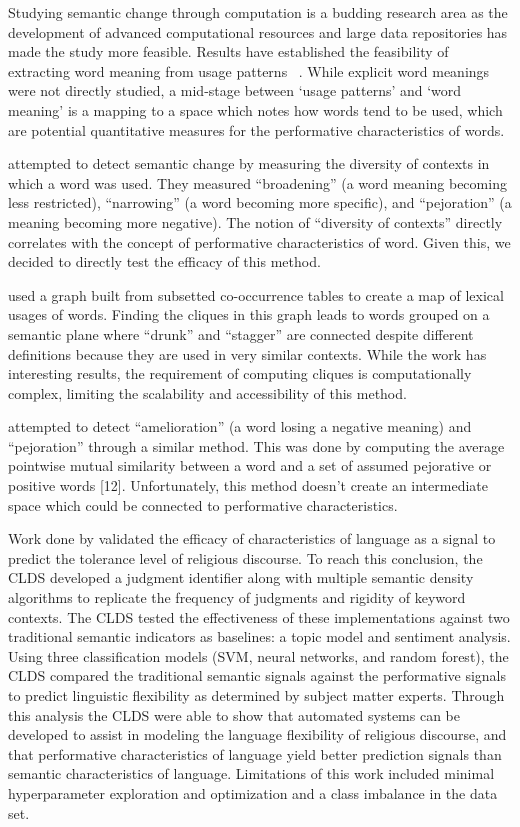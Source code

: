 \documentclass[11pt]{article}
\begin{document}
Studying semantic change through computation is a budding research area as the development of advanced computational resources and large data repositories has made the study more feasible. Results have established the feasibility of extracting word meaning from usage patterns ~\cite{Bullinaria2007,Lin1998}. While explicit word meanings were not directly studied, a mid-stage between ‘usage patterns’ and ‘word meaning’ is a mapping to a space which notes how words tend to be used, which are potential quantitative measures for the performative characteristics of words.

 attempted to detect semantic change by measuring the diversity of contexts in which a word was used. They measured “broadening” (a word meaning becoming less restricted), “narrowing” (a word becoming more specific), and “pejoration” (a meaning becoming more negative). The notion of “diversity of contexts” directly correlates with the concept of performative characteristics of word. Given this, we decided to directly test the efficacy of this method. 

 used a graph built from subsetted co-occurrence tables to create a map of lexical usages of words. Finding the cliques in this graph leads to words grouped on a semantic plane where “drunk” and “stagger” are connected despite different definitions because they are used in very similar contexts. While the work has interesting results, the requirement of computing cliques is computationally complex, limiting the scalability and accessibility of this method.

 attempted to detect “amelioration” (a word losing a negative meaning) and “pejoration” through a similar method. This was done by computing the average pointwise mutual similarity between a word and a set of assumed pejorative or positive words [12]. Unfortunately, this method doesn’t create an intermediate space which could be connected to performative characteristics.

Work done by  validated the efficacy of characteristics of language as a signal to predict the tolerance level of religious discourse. To reach this conclusion, the CLDS developed a judgment identifier along with multiple semantic density algorithms to replicate the frequency of judgments and rigidity of keyword contexts. The CLDS tested the effectiveness of these implementations against two traditional semantic indicators as baselines: a topic model and sentiment analysis. Using three classification models (SVM, neural networks, and random forest), the CLDS compared the traditional semantic signals against the performative signals to predict linguistic flexibility as determined by subject matter experts. Through this analysis the CLDS were able to show that automated systems can be developed to assist in modeling the language flexibility of religious discourse, and that performative characteristics of language yield better prediction signals than semantic characteristics of language. Limitations of this work included minimal hyperparameter exploration and optimization and a class imbalance in the data set. 
\end{document}
